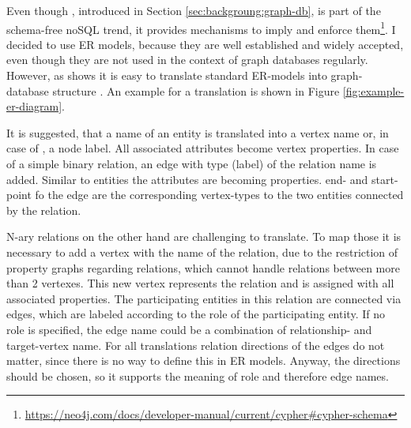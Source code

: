 Even though \neoj, introduced in Section \ref{sec:backgroung:graph-db}, is part of the schema-free noSQL trend, it provides mechanisms to imply and enforce them\footnote{\url{https://neo4j.com/docs/developer-manual/current/cypher\#cypher-schema}}.
I decided to use ER models, because they are well established and widely accepted, even though they are not used in the context of graph databases regularly.
However, as \citeauthor{Siriwaradhana2014} shows it is easy to translate standard ER-models into graph-database structure \citep{Siriwaradhana2014}.
An example for a translation is shown in Figure \ref{fig:example-er-diagram}.

It is suggested, that a name of an entity is translated into a vertex name or, in case of \neoj, a node label. All associated attributes become vertex properties.
In case of a simple binary relation, an edge with type (\neoj label) of the relation name is added. Similar to entities the attributes are becoming properties. end- and start-point fo the edge are the corresponding vertex-types to the two entities connected by the relation.

N-ary relations on the other hand are challenging to translate. To map those it is necessary to add a vertex with the name of the relation, due to the restriction of property graphs regarding relations, which cannot handle relations between more than 2 vertexes.
This new vertex represents the relation and is assigned with all associated properties. The participating entities in this relation are connected via edges, which are labeled according to the role of the participating entity. If no role is specified, the edge name could be a combination of relationship- and target-vertex name.
For all translations relation directions of the edges do not matter, since there is no way to define this in ER models. Anyway, the directions should be chosen, so it supports the meaning of role and therefore edge names.

